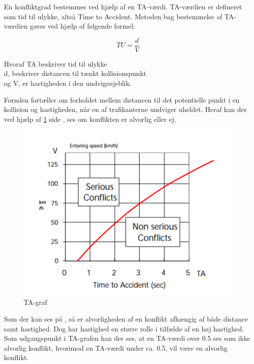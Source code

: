  En konfliktgrad bestemmes ved hjælp af en TA-værdi. TA-værdien er defineret som tid til ulykke, altså Time to Accident. Metoden bag bestemmelse af TA-værdien gøres ved hjælp af følgende formel:

 $$TU=\frac{d}{V} $$

Hvoraf TA beskriver tid til ulykke \\ d, beskriver distancen til tænkt kollisionspunkt \\ og V, er hastigheden i den undvigeøjeblik.

Formlen fortæller om forholdet mellem distancen til det potentielle punkt i en kollision og hastigheden, når en af trafikanterne undviger uheldet. Heraf kan der ved hjælp af \cref{fig:tagraff} side \pageref{fig:tagraff},
ses om konflikten er alvorlig eller ej.

\begin{figure}[htbp]

  \centering
  \begin{adjustbox}{max width=\textwidth}
    \includegraphics{figures/Billederogfigur/tugraf.png} %
 \end{adjustbox}
  \caption{TA-graf}
    \label{fig:tagraff}
\end{figure}

Som der kan ses på %
, så er alvorligheden af en konflikt afhængig af både distance samt hastighed. Dog har hastighed en større rolle i tilfælde af en høj hastighed.
Som udgangspunkt i TA-grafen kan der ses, at en TA-værdi over 0.5 ses som ikke alvorlig konflikt, hvorimod en TA-værdi under ca. 0.5, vil være en alvorlig konflikt.



